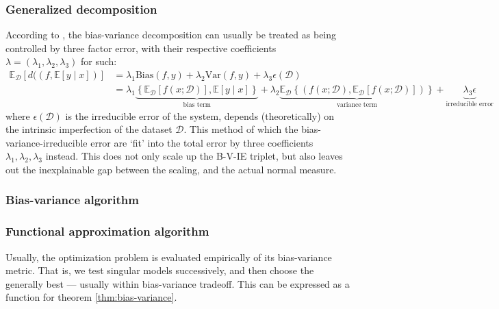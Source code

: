 \documentclass[10pt]{article} %
\begin{document}
\subsubsection{Generalized decomposition}

According to \cite{domingos_unified_aaai_2000,domingos_unified_2000}, the bias-variance decomposition can usually be treated as being controlled by three factor error, with their respective coefficients $\lambda=(\lambda_{1},\lambda_{2},\lambda_{3})$ for such: 
    \noindent 
    \begin{equation*}
        \begin{split}
            \mathbb{E}_{\mathcal{D}} \left[d((f,\mathbb{E}[y\mid x])\right] & = \lambda_{1} \mathrm{Bias}(f,y) + \lambda_{2}\mathrm{Var}(f,y)+ \lambda_{3}\epsilon(\mathcal{D})\\ 
            & = \lambda_{1}\underbrace{\left\{ \mathbb{E}_{\mathcal{D}}[f(x;\mathcal{D})] , \mathbb{E}[y\mid x] \right\}}_{\text{bias term}} +\lambda_{2} \underbrace{\mathbb{E}_{\mathcal{D}} \left\{(f(x;\mathcal{D}), \mathbb{E}_{\mathcal{D}}[f(x;\mathcal{D})])\right\}}_{\text{variance term}} +\underbrace{\lambda_{3}\epsilon}_{\text{irreducible error}}
        \end{split}
        \end{equation*}
where $\epsilon(\mathcal{D})$ is the irreducible error of the system, depends (theoretically) on the intrinsic imperfection of the dataset $\mathcal{D}$. This method of which the bias-variance-irreducible error are `fit' into the total error by three coefficients $\lambda_{1},\lambda_{2},\lambda_{3}$ instead. This does not only scale up the B-V-IE triplet, but also leaves out the inexplainable gap between the scaling, and the actual normal measure. 

\subsubsection{Bias-variance algorithm}

\subsubsection{Functional approximation algorithm}

Usually, the optimization problem is evaluated empirically of its bias-variance metric. That is, we test singular models successively, and then choose the generally best --- usually within bias-variance tradeoff. This can be expressed as a function for theorem \ref{thm:bias-variance}. 
\end{document}
